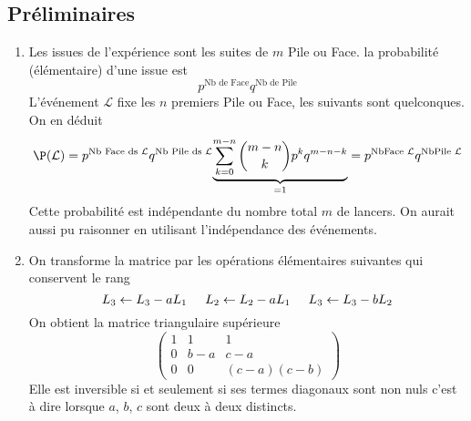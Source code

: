 \subsection*{Préliminaires}
\begin{enumerate}
 \item Les issues de l'expérience sont les suites de $m$ Pile ou Face. la probabilité (élémentaire) d'une issue est 
 \begin{displaymath}
  p^{\text{Nb de Face}} q^{\text{Nb de Pile}}
 \end{displaymath}
L'événement $\mathcal{L}$ fixe les $n$ premiers Pile ou Face, les suivants sont quelconques. On en déduit 
\begin{displaymath}
 \P(\mathcal{L})
 = p^{\text{Nb Face ds } \mathcal{L}} q^{\text{Nb Pile ds } \mathcal{L}}\underset{= 1 }{\underbrace{\sum_{k=0}^{m-n}\binom{m-n}{k}p^k q^{m-n-k}}}
 =  p^{\text{NbFace } \mathcal{L}} q^{\text{NbPile } \mathcal{L}}
\end{displaymath}
Cette probabilité est indépendante du nombre total $m$ de lancers. On aurait aussi pu raisonner en utilisant l'indépendance des événements.

 \item On transforme la matrice par les opérations élémentaires suivantes qui conservent le rang 
\begin{displaymath}
 L_3 \leftarrow L_3 -a L_1 \hspace{0.5cm} L_2 \leftarrow L_2 -a L_1 \hspace{0.5cm} L_3 \leftarrow L_3 -b L_2 
\end{displaymath}
On obtient la matrice triangulaire supérieure
\begin{displaymath}
\begin{pmatrix}
 1 & 1 & 1 \\
 0 & b-a & c-a \\
 0 & 0 & (c-a)(c-b)
\end{pmatrix}
\end{displaymath}
Elle est inversible si et seulement si ses termes diagonaux sont non nuls c'est à dire lorsque $a$, $b$, $c$ sont deux à deux distincts.
\end{enumerate}

